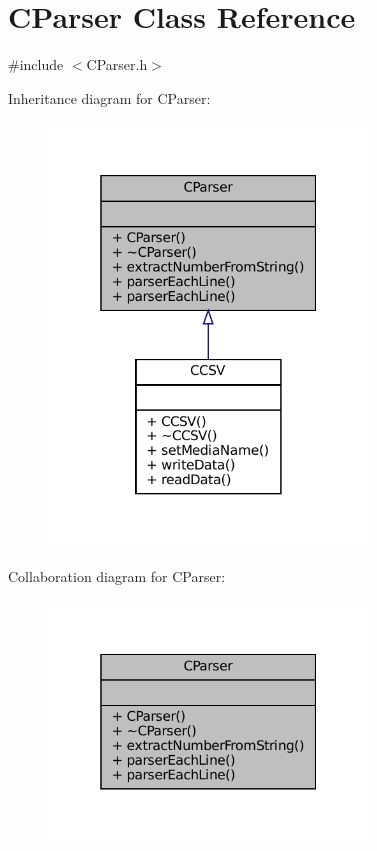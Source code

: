 \hypertarget{classCParser}{}\section{C\+Parser Class Reference}
\label{classCParser}


{\ttfamily \#include $<$C\+Parser.\+h$>$}



Inheritance diagram for C\+Parser\+:
\nopagebreak
\begin{figure}[H]
\begin{center}
\leavevmode
\includegraphics[width=241pt]{classCParser__inherit__graph}
\end{center}
\end{figure}


Collaboration diagram for C\+Parser\+:
\nopagebreak
\begin{figure}[H]
\begin{center}
\leavevmode
\includegraphics[width=241pt]{classCParser__coll__graph}
\end{center}
\end{figure}
